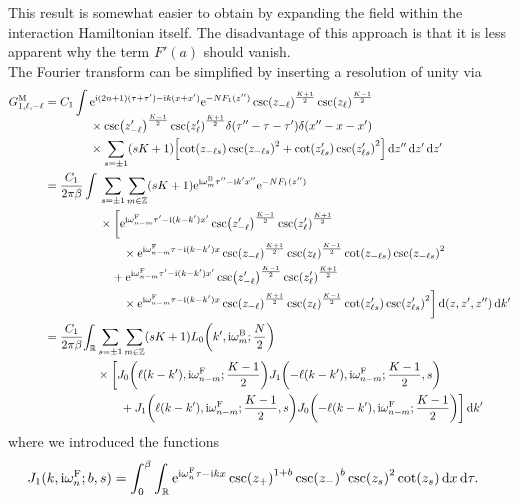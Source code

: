 \documentclass[english, parskip=full]{scrartcl}
\begin{document}
This result is somewhat easier to obtain by expanding the field within the interaction Hamiltonian itself.
The disadvantage of this approach is that it is less apparent why the term $F'(a)$ should vanish.\\
The Fourier transform can be simplified by inserting a resolution of unity via
\begin{align}
G_{1,\ell,-\ell}^\M &= C_1 \int \bsplit{& \powe{\i (2n+1)(\tau+\tau') - \i k(x+x')} \powe{-NF_1(z'')} \csc\kla*{z_{-\ell}}^{\frac{K+1}{2}} \csc\kla*{z_{\ell}}^{\frac{K-1}{2}} \\
&\times \csc\kla*{z_{-\ell}'}^{\frac{K-1}{2}} \csc\kla*{z_{\ell}'}^{\frac{K+1}{2}} \delta(\tau''-\tau-\tau') \delta(x''-x-x')\\
&\times \sum_{s=\pm 1} \kla*{sK+1} \klb[\Big]{ \cot\kla*{z_{-\ell s}}\csc\kla*{z_{-\ell s}}^2 + \cot\kla*{z_{\ell s}'} \csc\kla*{z_{\ell s}'}^2 }\,\d z'' \,\d z'\,\d z'}\\
&= \frac{C_1}{2\pi\beta} \int \bsplit{& \sum_{s=\pm 1} \sum_{m\in\mathbb{Z}} \kla*{sK+1} \powe{\i \omega_{m}^\B \tau'' -\i k'x''} \powe{-NF_1(z'')}\\
&\times \klb[\bigg]{\powe{\i \omega_{n-m}^\F \tau' -\i (k-k') x'}  \csc\kla*{z_{-\ell}'}^{\frac{K-1}{2}} \csc\kla*{z_{\ell}'}^{\frac{K+1}{2}}\\
&\qquad\times \powe{\i \omega_{n-m}^\F \tau -\i (k-k') x} \csc\kla*{z_{-\ell}}^{\frac{K+1}{2}} \csc\kla*{z_{\ell}}^{\frac{K-1}{2}} \cot\kla*{z_{-\ell s}} \csc\kla*{z_{-\ell s}}^2\\
&\quad + \powe{\i \omega_{n-m}^\F \tau' -\i (k-k') x'}  \csc\kla*{z_{-\ell}'}^{\frac{K-1}{2}} \csc\kla*{z_{\ell}'}^{\frac{K+1}{2}}\\
&\quad\quad\times \powe{\i \omega_{n-m}^\F \tau -\i (k-k') x} \csc\kla*{z_{-\ell}}^{\frac{K+1}{2}} \csc\kla*{z_{\ell}}^{\frac{K-1}{2}} \cot\kla*{z_{\ell s}'} \csc\kla*{z_{\ell s}'}^2} \,\d (z,z',z'')\,\d k' }\\
&= \frac{C_1}{2\pi\beta} \bsplit{\intr{& \sum_{s=\pm 1} \sum_{m\in\mathbb{Z}} (sK+1) L_0\kla*{k',\i \omega_m^\B; \frac{N}{2}} \\
&\times \klb[\bigg]{ J_0\kla*{\ell(k-k'), \i \omega_{n-m}^\F; \frac{K-1}{2}}  J_1\kla*{-\ell(k-k'), \i \omega_{n-m}^\F; \frac{K-1}{2}, s}\\
&\qquad + J_1\kla*{\ell(k-k'), \i \omega_{n-m}^\F; \frac{K-1}{2}, s} J_0\kla*{-\ell(k-k'), \i \omega_{n-m}^\F; \frac{K-1}{2}}} }{k'}}
\end{align}
where we introduced the functions
\begin{align}
J_1(k,\i\omega_n^\F;b,s) &= \intx{0}{\beta}{\intr{\powe{\i\omega_n^\F\tau - \i kx} \csc\kla*{z_+}^{1+b} \csc\kla*{z_-}^b \csc\kla*{z_s}^2 \cot\kla*{z_s} }{x} }{\tau}.
\end{align}
\end{document}
